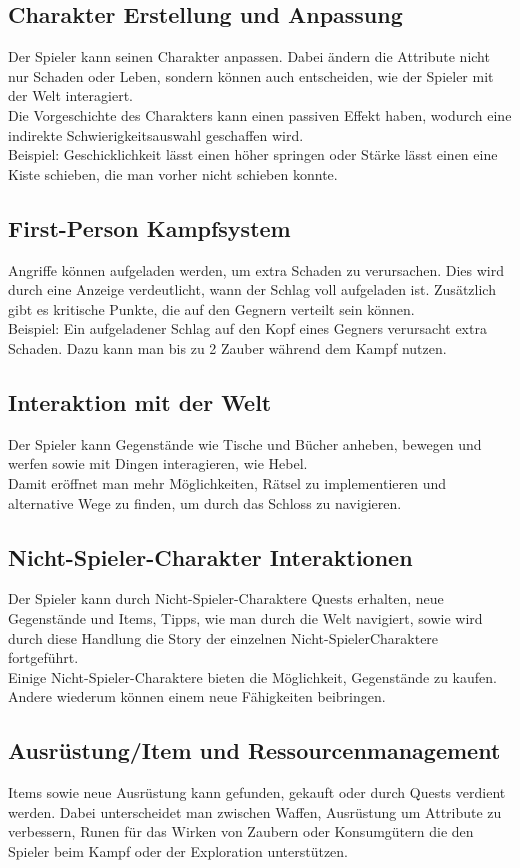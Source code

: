 \documentclass[envcountsame,envcountchap deutsch]{i-studis}
\begin{document}
		\subsection{Charakter Erstellung und Anpassung}
		Der Spieler kann seinen Charakter anpassen. Dabei ändern die Attribute nicht nur Schaden oder Leben,
		sondern können auch entscheiden, wie der Spieler mit der Welt interagiert.
		\\ Die Vorgeschichte des
		Charakters kann einen passiven Effekt haben, wodurch eine indirekte Schwierigkeitsauswahl geschaffen
		wird.
		\\ Beispiel: Geschicklichkeit lässt einen höher springen oder Stärke lässt einen eine Kiste schieben, die
		man vorher nicht schieben konnte.
		\subsection{First-Person Kampfsystem}
		Angriffe können aufgeladen werden, um extra Schaden zu verursachen. Dies wird durch eine Anzeige
		verdeutlicht, wann der Schlag voll aufgeladen ist. Zusätzlich gibt es kritische Punkte, die auf den Gegnern
		verteilt sein können.
		\\ Beispiel: Ein aufgeladener Schlag auf den Kopf eines Gegners verursacht extra
		Schaden. Dazu kann man bis zu 2 Zauber während dem Kampf nutzen.
		
		\pagebreak
		\subsection{Interaktion mit der Welt}
		Der Spieler kann Gegenstände wie Tische und Bücher anheben, bewegen und werfen sowie mit Dingen
		interagieren, wie Hebel.
		\\ Damit eröffnet man mehr Möglichkeiten, Rätsel zu implementieren und alternative
		Wege zu finden, um durch das Schloss zu navigieren.
		\subsection{Nicht-Spieler-Charakter Interaktionen}
		Der Spieler kann durch Nicht-Spieler-Charaktere Quests erhalten, neue Gegenstände und Items, Tipps, wie
		man durch die Welt navigiert, sowie wird durch diese Handlung die Story der einzelnen Nicht-SpielerCharaktere fortgeführt.
		\\ Einige Nicht-Spieler-Charaktere bieten die Möglichkeit, Gegenstände zu kaufen.
		Andere wiederum können einem neue Fähigkeiten beibringen.
		\subsection{Ausrüstung/Item und Ressourcenmanagement}
		Items sowie neue Ausrüstung kann gefunden, gekauft oder durch Quests verdient werden.
		Dabei unterscheidet man zwischen Waffen, Ausrüstung um Attribute zu verbessern, Runen für das Wirken
		von Zaubern oder Konsumgütern die den Spieler beim Kampf oder der Exploration unterstützen. 
\end{document}
